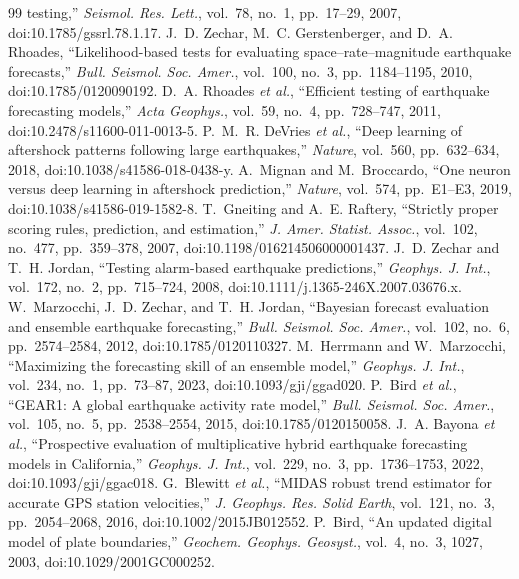 \documentclass[journal]{IEEEtran}
\begin{document}
\begin{thebibliography}{99}
testing,'' \emph{Seismol. Res. Lett.}, vol.~78, no.~1, pp.~17--29, 2007,
doi:10.1785/gssrl.78.1.17.
 J.~D. Zechar, M.~C. Gerstenberger, and D.~A. Rhoades, ``Likelihood-based
tests for evaluating space--rate--magnitude earthquake forecasts,'' \emph{Bull. Seismol. Soc.
Amer.}, vol.~100, no.~3, pp.~1184--1195, 2010, doi:10.1785/0120090192.
 D.~A. Rhoades \emph{et al.}, ``Efficient testing of earthquake
forecasting models,'' \emph{Acta Geophys.}, vol.~59, no.~4, pp.~728--747, 2011,
doi:10.2478/s11600-011-0013-5.
 P.~M.~R. DeVries \emph{et al.}, ``Deep learning of aftershock patterns
following large earthquakes,'' \emph{Nature}, vol.~560, pp.~632--634, 2018,
doi:10.1038/s41586-018-0438-y.
 A.~Mignan and M.~Broccardo, ``One neuron versus deep learning in
aftershock prediction,'' \emph{Nature}, vol.~574, pp.~E1--E3, 2019,
doi:10.1038/s41586-019-1582-8.
 T.~Gneiting and A.~E. Raftery, ``Strictly proper scoring rules,
prediction, and estimation,'' \emph{J. Amer. Statist. Assoc.}, vol.~102, no.~477,
pp.~359--378, 2007, doi:10.1198/016214506000001437.
 J.~D. Zechar and T.~H. Jordan, ``Testing alarm-based earthquake
predictions,'' \emph{Geophys. J. Int.}, vol.~172, no.~2, pp.~715--724, 2008,
doi:10.1111/j.1365-246X.2007.03676.x.
 W.~Marzocchi, J.~D. Zechar, and T.~H. Jordan, ``Bayesian forecast
evaluation and ensemble earthquake forecasting,'' \emph{Bull. Seismol. Soc. Amer.}, vol.~102,
no.~6, pp.~2574--2584, 2012, doi:10.1785/0120110327.
 M.~Herrmann and W.~Marzocchi, ``Maximizing the forecasting skill of an
ensemble model,'' \emph{Geophys. J. Int.}, vol.~234, no.~1, pp.~73--87, 2023,
doi:10.1093/gji/ggad020.
 P.~Bird \emph{et al.}, ``GEAR1: A global earthquake activity rate model,''
\emph{Bull. Seismol. Soc. Amer.}, vol.~105, no.~5, pp.~2538--2554, 2015,
doi:10.1785/0120150058.
 J.~A. Bayona \emph{et al.}, ``Prospective evaluation of multiplicative
hybrid earthquake forecasting models in California,'' \emph{Geophys. J. Int.}, vol.~229,
no.~3, pp.~1736--1753, 2022, doi:10.1093/gji/ggac018.
 G.~Blewitt \emph{et al.}, ``MIDAS robust trend estimator for accurate
GPS station velocities,'' \emph{J. Geophys. Res. Solid Earth}, vol.~121, no.~3,
pp.~2054--2068, 2016, doi:10.1002/2015JB012552.
 P.~Bird, ``An updated digital model of plate boundaries,'' \emph{Geochem.
Geophys. Geosyst.}, vol.~4, no.~3, 1027, 2003, doi:10.1029/2001GC000252.

\end{thebibliography}
\end{document}
